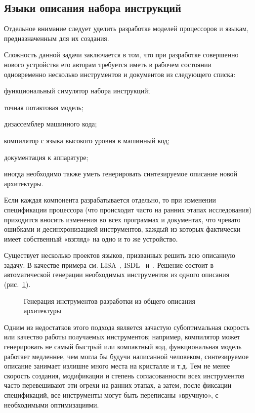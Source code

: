 \subsection{Языки описания набора инструкций}

Отдельное внимание следует уделить разработке моделей процессоров и языкам, предназначенным для их создания.

Сложность данной задачи заключается в том, что при разработке совершенно нового устройства его авторам требуется иметь в рабочем состоянии одновременно  несколько инструментов и документов из следующего списка:

\begin{itemize*}
\item функциональный симулятор набора инструкций;
\item точная потактовая модель;
\item дизассемблер машинного кода;
\item компилятор с языка высокого уровня в машинный код;
\item документация к аппаратуре;
\item иногда необходимо также уметь генерировать синтезируемое описание новой архитектуры.
\end{itemize*}

Если каждая компонента разрабатывается отдельно, то при изменении спецификации процессора (что происходит часто на ранних этапах исследования) приходится вносить изменения во всех программах и документах, что чревато ошибками и десинхронизацией инструментов, каждый из которых фактически имеет собственный «взгляд» на одно и то же устройство.  

Существует несколько проектов языков, призванных решить всю описанную задачу. В качестве примера см. LISA~\citep{wahlen2004c,zivojnovic1996,schliebusch2002}, ISDL~\citep{Hadjiyiannis97isdl:an,isdl1997} и~\citep{hoffmann2001}. Решение состоит в автоматической генерации необходимых инструментов из одного описания (рис.~\ref{fig:lisa}). 

\begin{figure}[htb]
    \centering
    \caption{Генерация инструментов разработки из общего описания архитектуры}
    \label{fig:lisa}
\end{figure}


Одним из недостатков этого подхода является зачастую субоптимальная скорость или качество работы получаемых инструментов; например, компилятор может генерировать не самый быстрый или компактный код, функциональная модель работает медленнее, чем могла бы будучи написанной человеком, синтезируемое описание занимает излишне много места на кристалле и т.д. Тем не менее скорость создания, модификации и степень согласованности всех инструментов часто перевешивают эти огрехи на ранних этапах, а затем, после фиксации спецификаций, все инструменты могут быть переписаны «вручную», с необходимыми оптимизациями.

